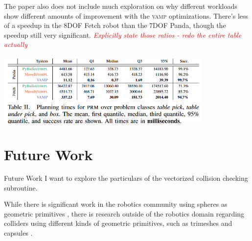 \documentclass{beamer}
\newcommand{\todo}[1]{\textit{\textcolor{red}{#1}}}
\begin{document}
\begin{frame}
The paper also does not include much exploration on why different workloads show different amounts of improvement with the \textsc{vamp} optimizations. There’s less of a speedup in the 8DOF Fetch robot than the 7DOF Panda, though the speedup still very significant. \todo{Explicitly state those ratios - redo the entire table actually}

\includegraphics[width=0.8\textwidth]{./assets/78_table.png} \cite{paper:MiM}
\end{frame}

\section{Future Work}
\begin{frame}[allowframebreaks]{Future Work}
I want to explore the particulars of the vectorized collision checking subroutine. 

While there is significant work in the robotics community using spheres as geometric primitives \cite{paper:cuRobo}, there is research outside of the robotics domain regarding colliders using different kinds of geometric primitives, such as trimeshes and capsules \cite{web:UE_cols}. 
\end{frame}


\begin{frame}[allowframebreaks]
\printbibliography
\end{frame}
\end{document}
